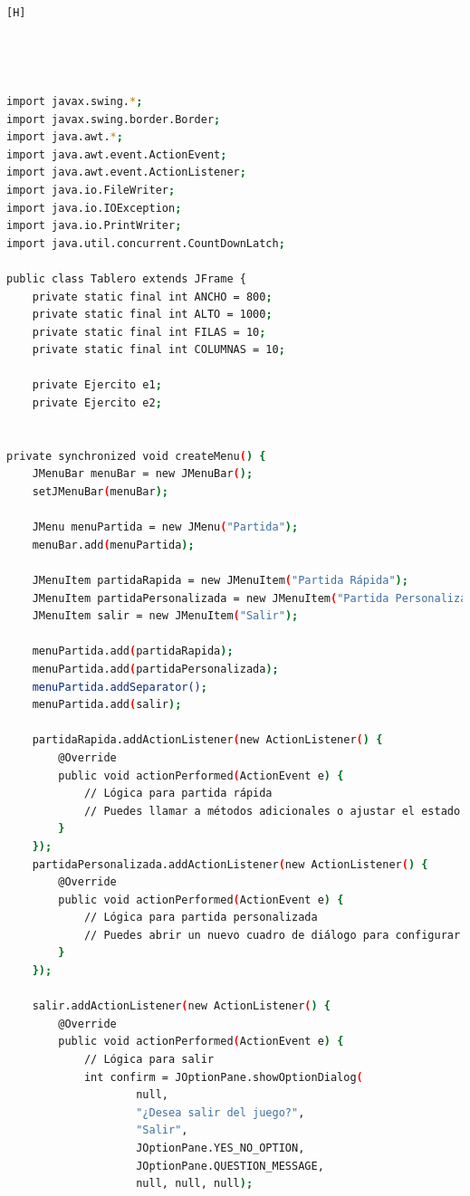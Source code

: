 \documentclass{article}
\begin{document}
	\begin{lstlisting}[language=bash,caption={CLASE Tablero}][H]
	



import javax.swing.*;
import javax.swing.border.Border;
import java.awt.*;
import java.awt.event.ActionEvent;
import java.awt.event.ActionListener;
import java.io.FileWriter;
import java.io.IOException;
import java.io.PrintWriter;
import java.util.concurrent.CountDownLatch;

public class Tablero extends JFrame {
    private static final int ANCHO = 800;
    private static final int ALTO = 1000;
    private static final int FILAS = 10;
    private static final int COLUMNAS = 10;

    private Ejercito e1;
    private Ejercito e2;
    

private synchronized void createMenu() {
    JMenuBar menuBar = new JMenuBar();
    setJMenuBar(menuBar);

    JMenu menuPartida = new JMenu("Partida");
    menuBar.add(menuPartida);

    JMenuItem partidaRapida = new JMenuItem("Partida Rápida");
    JMenuItem partidaPersonalizada = new JMenuItem("Partida Personalizada");
    JMenuItem salir = new JMenuItem("Salir");

    menuPartida.add(partidaRapida);
    menuPartida.add(partidaPersonalizada);
    menuPartida.addSeparator();
    menuPartida.add(salir);

    partidaRapida.addActionListener(new ActionListener() {
        @Override
        public void actionPerformed(ActionEvent e) {
            // Lógica para partida rápida
            // Puedes llamar a métodos adicionales o ajustar el estado del juego
        }
    });
    partidaPersonalizada.addActionListener(new ActionListener() {
        @Override
        public void actionPerformed(ActionEvent e) {
            // Lógica para partida personalizada
            // Puedes abrir un nuevo cuadro de diálogo para configurar opciones
        }
    });

    salir.addActionListener(new ActionListener() {
        @Override
        public void actionPerformed(ActionEvent e) {
            // Lógica para salir
            int confirm = JOptionPane.showOptionDialog(
                    null,
                    "¿Desea salir del juego?",
                    "Salir",
                    JOptionPane.YES_NO_OPTION,
                    JOptionPane.QUESTION_MESSAGE,
                    null, null, null);


\end{lstlisting}
\end{document}

